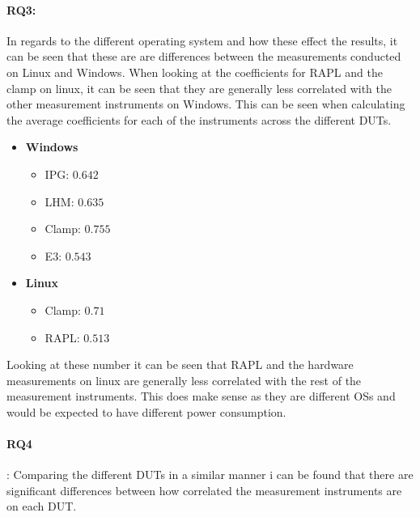 \paragraph{RQ3:} In regards to the different operating system and how these effect the results, it can be seen that these are are differences between the measurements conducted on Linux and Windows. When looking at the coefficients for RAPL and the clamp on linux, it can be seen that they are generally less correlated with the other measurement instruments on Windows. This can be seen when calculating the average coefficients for each of the instruments across the different DUTs.

\begin{itemize}
    \item \textbf{Windows}
    \begin{itemize}
        \item IPG: $0.642$ %
        \item LHM: $0.635$ %
        \item Clamp: $0.755$ %
        \item E3: $0.543$ %
    \end{itemize}
    \item \textbf{Linux}
    \begin{itemize}
        \item Clamp: $0.71$ %
        \item RAPL: $0.513$ %
    \end{itemize}
\end{itemize}

Looking at these number it can be seen that RAPL and the hardware measurements on linux are generally less correlated with the rest of the measurement instruments. This does make sense as they are different OSs and would be expected to have different power consumption.

\paragraph{RQ4}: Comparing the different DUTs in a similar manner i can be found that there are significant differences between how correlated the measurement instruments are on each DUT.

